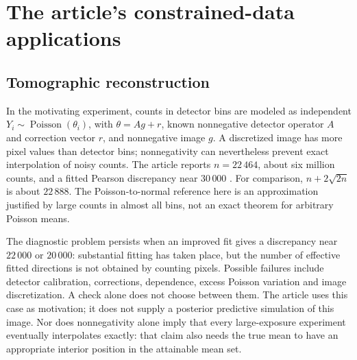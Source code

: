 \section{The article's constrained-data applications}
\label{sec:p15-ppc-constrained-applications}

\subsection{Tomographic reconstruction}
In the motivating experiment, counts in detector bins are modeled as
independent \(Y_i\sim\operatorname{Poisson}(\theta_i)\), with
\(\theta=Ag+r\), known nonnegative detector operator \(A\) and
correction vector \(r\), and nonnegative image \(g\). A discretized
image has more pixel values than detector bins; nonnegativity can nevertheless
prevent exact interpolation of noisy counts. The article reports
\(n=22\,464\), about six million counts, and a fitted Pearson discrepancy
near \(30\,000\) \cite[sec.~1.2]{GelmanMengStern1996Main}.
For comparison, \(n+2\sqrt{2n}\) is about \(22\,888\).
The Poisson-to-normal reference here is an approximation justified by large
counts in almost all bins, not an exact theorem for arbitrary Poisson means.

The diagnostic problem persists when an improved fit gives a discrepancy
near \(22\,000\) or \(20\,000\): substantial fitting has taken place,
but the number of effective fitted directions is not obtained by counting
pixels. Possible failures include detector calibration, corrections,
dependence, excess Poisson variation and image discretization. A check alone
does not choose between them. The article uses this case as motivation; it
does not supply a posterior predictive simulation of this image. Nor does
nonnegativity alone imply that every large-exposure experiment eventually
interpolates exactly: that claim also needs the true mean to have an
appropriate interior position in the attainable mean set.


